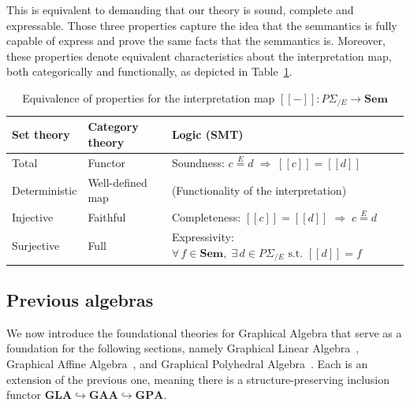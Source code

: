 This is equivalent to demanding that our theory is sound, complete and expressable. Those three properties capture the idea that the semmantics is fully capable of express and prove the same facts that the semmantics is. Moreover, these properties denote equivalent characteristics about the interpretation map, both categorically and functionally, as depicted in Table~\ref{tab:equivalences}.

\begin{table}[h!]
	\centering
	\caption{Equivalence of properties for the interpretation map
	$[\![{-}]\!] : P\Sigma_{/E} \to \mathbf{Sem}$}
	\label{tab:equivalences}
	\begin{tabular}{
			m{3.2cm}
			m{3.2cm}
			m{4.5cm}
		}
		\toprule
		\textbf{Set theory}      &
		\textbf{Category theory} &
		\textbf{Logic (SMT)}                                                                                     \\
		\midrule
		Total                    &
		Functor                  &
		Soundness: $c \overset{E}{=} d \;\Rightarrow\; [\![c]\!] = [\![d]\!]$                                    \\[6pt]
		Deterministic            &
		Well-defined map         &
		(Functionality of the interpretation)                                                                    \\[6pt]
		Injective                &
		Faithful                 &
		Completeness: $[\![c]\!] = [\![d]\!] \;\Rightarrow\; c \overset{E}{=} d$                                 \\[6pt]
		Surjective               &
		Full                     &
		Expressivity: $\forall\, f \in \mathbf{Sem},\; \exists\, d \in P\Sigma_{/E} \text{ s.t. } [\![d]\!] = f$ \\
		\bottomrule
	\end{tabular}
\end{table}

\subsection{Previous algebras}

We now introduce the foundational theories for Graphical Algebra that serve as a foundation for the following sections, namely Graphical Linear Algebra~\cite{paixao2022highlevel,bonchi2017interacting}, Graphical Affine Algebra~\cite{bonchi2019affine}, and Graphical Polyhedral Algebra~\cite{bonchi2021polyhedral}. Each is an extension of the previous one, meaning there is a structure-preserving inclusion functor $\mathbf{GLA} \hookrightarrow \mathbf{GAA} \hookrightarrow \mathbf{GPA}$.

